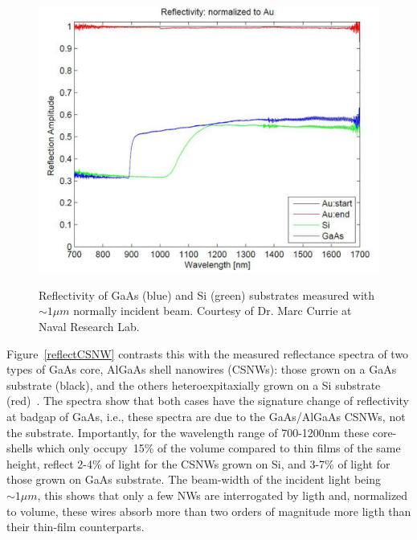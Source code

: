 \begin{figure}
  \caption{Reflectivity of GaAs (blue) and Si (green) substrates measured with $\sim{1}{\mu}m$ normally incident beam. Courtesy of Dr. Marc Currie at Naval Research Lab.}
  \centering
  \includegraphics[width=\textwidth]{pictures/Data/reflecbulk}
  \label{reflecbulk}
\end{figure}

Figure~\ref{reflectCSNW} contrasts this with the measured reflectance spectra
of two types of GaAs core, AlGaAs shell nanowires (CSNWs): those grown on a
GaAs substrate (black), and the others heteroexpitaxially grown on a Si
substrate (red)~\cite{Wang:2013ux}. The spectra show that both cases have the
signature change of reflectivity at badgap of GaAs, i.e., these spectra are due
to the GaAs/AlGaAs CSNWs, not the substrate. Importantly, for the wavelength
range of 700-1200nm these core-shells which only occupy~15\% of the volume
compared to thin films of the same height, reflect 2-4\% of light for the CSNWs
grown on Si, and 3-7\% of light for those grown on GaAs substrate. The
beam-width of the incident light being $\sim1{\mu}m$, this shows that only a
few NWs are interrogated by ligth and, normalized to volume, these wires absorb
more than two orders of magnitude more ligth than their thin-film counterparts.

